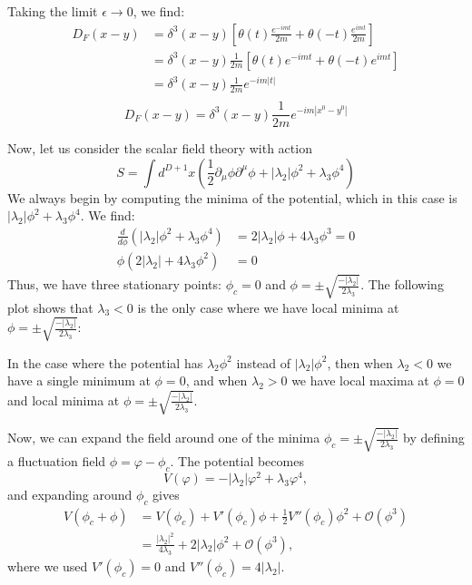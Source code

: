 \documentclass[12pt]{article}
\newcommand{\delmu}{\partial_{\mu}}
\newcommand{\delMu}{\partial^{\mu}}
\newcommand{\+}{\dagger}
\begin{document}
Taking the limit $\epsilon \to 0$, we find:
\begin{align*}
    D_F(x-y) &= \delta^3(x-y) \left[ \theta(t) \frac{e^{-imt}}{2m} +  \theta(-t)
    \frac{e^{imt}}{2m} \right] \\
    &= \delta^3(x-y) \frac{1}{2m} \left[ \theta(t) e^{-imt} +  \theta(-t) e^{imt}
    \right] \\
    &= \delta^3(x-y) \frac{1}{2m} e^{-im|t|} \\
\end{align*}
\begin{equation}
    \boxed{D_F(x-y) = \delta^3(x-y) \frac{1}{2m} e^{-im|x^0 - y^0|}}
\end{equation}

Now, let us consider the scalar field theory with action 
\begin{equation}
    S =  \int d^{D+1}x \left( \frac{1}{2}\delmu\phi\delMu\phi + |\lambda_2|\phi^2 + \lambda_3\phi^4 \right)
\end{equation}
We always begin by computing the minima of the potential, which  in this case is $|\lambda_2|\phi^2 + \lambda_3\phi^4$. We find:
\begin{align*}
    \frac{d}{d\phi} (|\lambda_2|\phi^2 + \lambda_3\phi^4) &= 2|\lambda_2|\phi + 4\lambda_3\phi^3 = 0 \\
    \phi(2|\lambda_2| + 4\lambda_3\phi^2) &= 0
\end{align*}
Thus, we have three stationary points: $\phi_c = 0$ and $\phi = \pm
\sqrt{\frac{-|\lambda_2|}{2\lambda_3}}$. The following plot shows that $\lambda_3 < 0$ is 
the only case where we have local minima at $\phi = \pm \sqrt{\frac{-|\lambda_2|}{2\lambda_3}}$:
\begin{center}
\end{center}
In the case where the potential has $\lambda_2\phi^2$ instead of
$|\lambda_2|\phi^2$, then when $\lambda_2 < 0$ we have a single minimum at $\phi = 0$,
and when $\lambda_2 > 0$ we have local maxima at $\phi = 0$ and local minima at $\phi = \pm
\sqrt{\frac{-|\lambda_2|}{2\lambda_3}}$.

Now, we can expand the field around one of the minima $\phi_c = \pm
\sqrt{\frac{-|\lambda_2|}{2\lambda_3}}$ by defining a fluctuation field
$\phi = \varphi - \phi_c$. The potential becomes
\begin{equation}
    V(\varphi) = -|\lambda_2|\varphi^2 + \lambda_3 \varphi^4,
\end{equation}
and expanding around $\phi_c$ gives
\begin{align}
    V(\phi_c + \phi)
    &= V(\phi_c) + V'(\phi_c)\phi + \frac{1}{2}V''(\phi_c)\phi^2 + \mathcal{O}(\phi^3) \\
    &= \frac{|\lambda_2|^2}{4\lambda_3} + 2|\lambda_2|\phi^2 + \mathcal{O}(\phi^3),
\end{align}
where we used $V'(\phi_c) = 0$ and $V''(\phi_c) = 4|\lambda_2|$.
\end{document}
